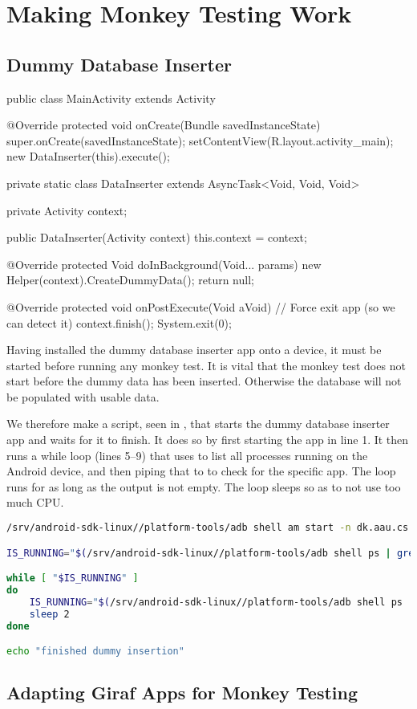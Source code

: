 \chapter{Making Monkey Testing Work}
\dummy

\section{Dummy Database Inserter}
\begin{javacode}[caption=Dummy database inserter MainActivity,label=lst:dummy_db_ins_main_activity]
public class MainActivity extends Activity {
    @Override
    protected void onCreate(Bundle savedInstanceState) {
        super.onCreate(savedInstanceState);
        setContentView(R.layout.activity_main);
        new DataInserter(this).execute();
    }

    private static class DataInserter extends AsyncTask<Void, Void, Void> {
        private Activity context;

        public DataInserter(Activity context) {
            this.context = context;
        }

        @Override
        protected Void doInBackground(Void... params) {
            new Helper(context).CreateDummyData();
            return null;
        }

        @Override
        protected void onPostExecute(Void aVoid) {
            // Force exit app (so we can detect it)
            context.finish();
            System.exit(0);
        }
    }
}
\end{javacode}

Having installed the dummy database inserter app onto a device, it must be started before running any monkey test. It is vital that the monkey test does not start before the dummy data has been inserted. Otherwise the database will not be populated with usable data.

We therefore make a script, seen in , that starts the dummy database inserter app and waits for it to finish. It does so by first starting the app in line 1. It then runs a while loop (lines 5--9) that uses  to list all processes running on the Android device, and then piping that to  to check for the specific app. The loop runs for as long as the output is not empty. The loop sleeps so as to not use too much CPU.

\begin{lstlisting}[language=bash,showstringspaces=false,caption=Start and wait for dummy database inserter,label=lst:start_wait_dummy_db_inserter]
/srv/android-sdk-linux//platform-tools/adb shell am start -n dk.aau.cs.giraf.dummydbinserter/dk.aau.cs.giraf.dummydbinserter.MainActivity

IS_RUNNING="$(/srv/android-sdk-linux//platform-tools/adb shell ps | grep dk.aau.cs.giraf.dummydbinserter)"

while [ "$IS_RUNNING" ]
do
    IS_RUNNING="$(/srv/android-sdk-linux//platform-tools/adb shell ps | grep dk.aau.cs.giraf.dummydbinserter)"
    sleep 2
done

echo "finished dummy insertion"
\end{lstlisting}

\section{Adapting Giraf Apps for Monkey Testing}
\dummy